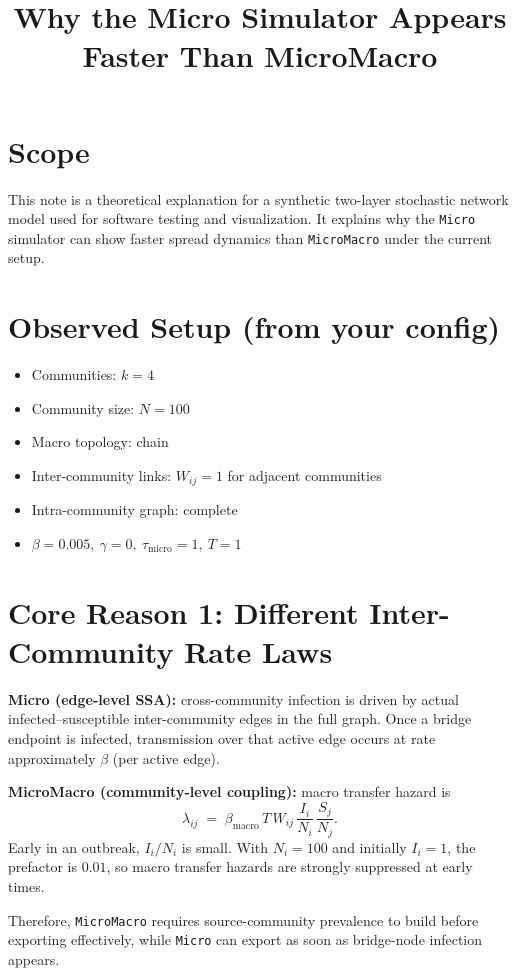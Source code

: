 \documentclass[11pt]{article}
\title{Why the Micro Simulator Appears Faster Than MicroMacro}
\author{}
\date{}
\begin{document}
\maketitle

\section*{Scope}
This note is a theoretical explanation for a synthetic two-layer stochastic network model used for software testing and visualization. It explains why the \texttt{Micro} simulator can show faster spread dynamics than \texttt{MicroMacro} under the current setup.

\section*{Observed Setup (from your config)}
\begin{itemize}
\item Communities: $k=4$
\item Community size: $N=100$
\item Macro topology: chain
\item Inter-community links: $W_{ij}=1$ for adjacent communities
\item Intra-community graph: complete
\item $\beta=0.005,\ \gamma=0,\ \tau_{\text{micro}}=1,\ T=1$
\end{itemize}

\section*{Core Reason 1: Different Inter-Community Rate Laws}
\textbf{Micro (edge-level SSA):} cross-community infection is driven by actual infected--susceptible inter-community edges in the full graph. Once a bridge endpoint is infected, transmission over that active edge occurs at rate approximately $\beta$ (per active edge).

\textbf{MicroMacro (community-level coupling):} macro transfer hazard is
\[
\lambda_{ij} \;=\; \beta_{\text{macro}}\,T\,W_{ij}\,\frac{I_i}{N_i}\,\frac{S_j}{N_j}.
\]
Early in an outbreak, $I_i/N_i$ is small. With $N_i=100$ and initially $I_i=1$, the prefactor is $0.01$, so macro transfer hazards are strongly suppressed at early times.

Therefore, \texttt{MicroMacro} requires source-community prevalence to build before exporting effectively, while \texttt{Micro} can export as soon as bridge-node infection appears.
\end{document}
